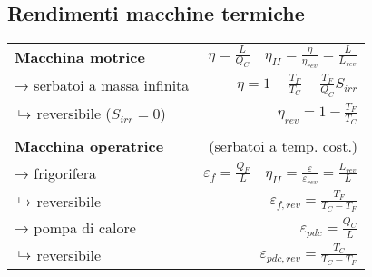 \subsection{Rendimenti macchine termiche}
{\renewcommand{\arraystretch}{1.5}
\begin{tabular}{p{3.5cm}r}
\textbf{Macchina motrice} & $\eta = \frac{L}{Q_C} \quad \eta_{II} = \frac{\eta}{\eta_{rev}} = \frac{L}{L_{rev}} $ \\
→ serbatoi a massa infinita & $\eta = 1 - \frac{T_F}{T_C} - \frac{T_F}{Q_C}S_{irr}$ \\
\phantom{→}$\put(3,2){\line(0,1){5}}\to$ reversibile ($S_{irr} = 0$) & $\eta_{rev} = 1 - \frac{T_F}{T_C}$ \\
\\
\textbf{Macchina operatrice} & (serbatoi a temp. cost.) \\
→ frigorifera & $\varepsilon_f = \frac{Q_F}{L} \quad \eta_{II} = \frac{\varepsilon}{\varepsilon_{rev}} = \frac{L_{rev}}{L}$ \\
\phantom{→}$\put(3,2){\line(0,1){5}}\to$ reversibile & $\varepsilon_{f,rev} = \frac{T_F}{T_C - T_F}$ \\
→ pompa di calore & $\varepsilon_{pdc} = \frac{Q_C}{L}$ \\
\phantom{→}$\put(3,2){\line(0,1){5}}\to$ reversibile & $\varepsilon_{pdc,rev} = \frac{T_C}{T_C - T_F}$ \\
\end{tabular}
}
